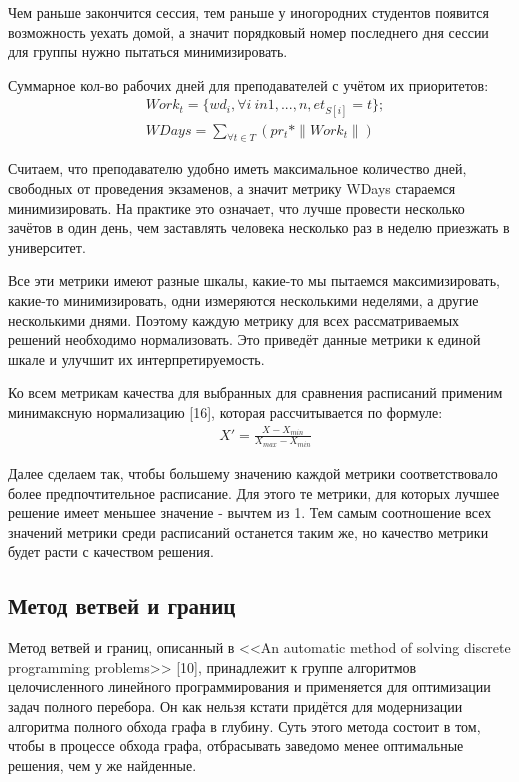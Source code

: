 Чем раньше закончится сессия, тем раньше у иногородних студентов появится возможность уехать домой, а значит порядковый номер последнего дня сессии для группы нужно пытаться минимизировать.

Суммарное кол-во рабочих дней для преподавателей с учётом их приоритетов:
\begin{align}
	& Work_t = \{wd_i, \forall i \ in {1,...,n}, et_{S[i]} = t\};\\
	& {WDays} =  \sum\limits_{\forall  t \in T}(pr_t * \|Work_t\|) 
\end{align}

Считаем, что преподавателю удобно иметь максимальное количество дней, свободных от проведения экзаменов, а значит метрику WDays стараемся минимизировать. На практике это означает, что лучше провести несколько зачётов в один день, чем заставлять человека несколько раз в неделю приезжать в университет.

Все эти метрики имеют разные шкалы, какие-то мы пытаемся максимизировать, какие-то минимизировать, одни измеряются несколькими неделями, а другие несколькими днями. Поэтому каждую метрику для всех рассматриваемых решений необходимо нормализовать. Это приведёт данные метрики к единой шкале и улучшит их интерпретируемость.

Ко всем метрикам качества для выбранных для сравнения расписаний применим минимаксную нормализацию [16], которая рассчитывается по формуле:
\begin{align}
	& X' =  \frac{X-X_{min}}{X_{max}-X_{min}}
\end{align}

Далее сделаем так, чтобы большему значению каждой метрики соответствовало более предпочтительное расписание. Для этого те метрики, для которых лучшее решение имеет меньшее значение - вычтем из 1. Тем самым соотношение всех значений метрики среди расписаний останется таким же, но качество метрики будет расти с качеством решения. 

\subsection{Метод ветвей и границ}
Метод ветвей и границ, описанный в <<An automatic method of solving discrete programming problems>> [10], принадлежит к группе алгоритмов целочисленного линейного программирования и применяется для оптимизации задач полного перебора. Он как нельзя кстати придётся для модернизации алгоритма полного обхода графа в глубину.
Суть этого метода состоит в том, чтобы в процессе обхода графа, отбрасывать заведомо менее оптимальные решения, чем у же найденные.

